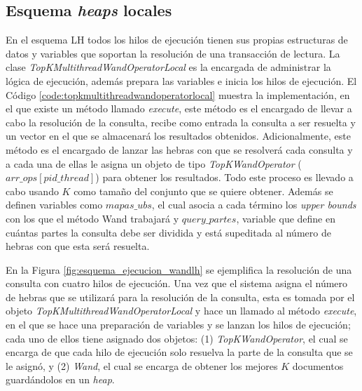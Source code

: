 \subsection{Esquema \textit{heaps} locales }
\label{evaluacionexperimental:esquemalh}
En el esquema LH todos los hilos de ejecución tienen sus propias estructuras de datos y variables que soportan la resolución de una transacción de lectura. La clase \textit{TopKMultithreadWandOperatorLocal} es la encargada de administrar la lógica de ejecución, además prepara las variables e inicia los hilos de ejecución. El Código \ref{code:topkmultithreadwandoperatorlocal} muestra la implementación, en el que existe un método llamado \textit{execute}, este método es el encargado de llevar a cabo la resolución de la consulta, recibe como entrada la consulta a ser resuelta y un vector en el que se almacenará los resultados obtenidos. Adicionalmente, este método es el encargado de lanzar las hebras con que se resolverá cada consulta y a cada una de ellas le asigna un objeto de tipo \textit{TopKWandOperator} ($arr\_ops[pid\_thread]$) para obtener los resultados. Todo este proceso es llevado a cabo usando $K$ como tamaño del conjunto que se quiere obtener. Además se definen variables como \textit{$mapas\_ubs$}, el cual asocia a cada término los \textit{upper bounds} con los que el método Wand trabajará y \textit{$query\_partes$}, variable que define en cuántas partes la consulta debe ser dividida y está supeditada al número de hebras con que esta será resuelta.



En la Figura \ref{fig:esquema_ejecucion_wandlh} se ejemplifica la resolución de una consulta con cuatro hilos de ejecución. Una vez que el sistema asigna el número de hebras que se utilizará para la resolución de la consulta, esta es tomada por el objeto \textit{TopKMultithreadWandOperatorLocal} y hace un llamado al método \textit{execute}, en el que se hace una preparación de variables y se lanzan los hilos de ejecución; cada uno de ellos tiene asignado dos objetos: (1) \textit{TopKWandOperator}, el cual se encarga de que cada hilo de ejecución solo resuelva la parte de la consulta que se le asignó, y (2) \textit{Wand}, el cual se encarga de obtener los mejores $K$ documentos guardándolos en un \textit{heap}.

